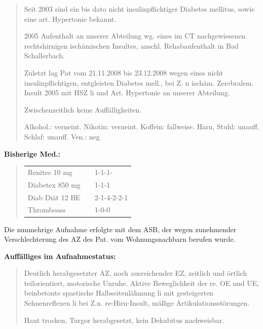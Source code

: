 {\begin{quote}
  Seit 2003 sind ein bis dato nicht insulinpflichtiger Diabetes mellitus, sowie
  eine art. Hypertonie bekannt.
  
  2005 Aufenthalt an unserer Abteilung wg. eines im CT nachgewiesenen rechtshirnigen ischämischen Insultes,
  anschl. Rehabaufenthalt in Bad Schallerbach.
  
  Zuletzt lag Pat vom 21.11.2008 bis 23.12.2008 wegen eines nicht
  insulinpflichtigen, entgleisten Diabetes mell., bei Z. n ischäm. Zerebralem.
  Insult 2005 mit HSZ li und Art.
  Hypertonie an unserer Abteilung.
  
  Zwischenzeitlich keine Auffälligkeiten.
  
  Alkohol.: verneint. Nikotin: verneint. Koffein: fallweise. Harn, Stuhl: unauff.
  Schlaf: unauff. Ven.: neg
\end{quote}


{\bfseries Bisherige Med.:} 

\begin{quote}
  \begin{tabular}{lll}
Renitec 10 mg &&1-1-1-
\\
Diabetex 850 mg &&1-1-1
\\
Diab Diät 12 BE &&2-1-4-2-2-1
\\
Thromboass &&1-0-0
\\
\end{tabular}
\end{quote}





 Die nunmehrige Aufnahme erfolgte mit dem ASB, der wegen zunehmender
 Verschlechterung des AZ des Pat. vom Wohnungsnachbarn berufen wurde.

{\bfseries Auffälliges im Aufnahmestatus:}

\begin{quote}
 Deutlich herabgesetzter AZ, noch ausreichender EZ, zeitlich und örtlich
 teilorientiert, motorische Unruhe. Aktive Beweglichkeit der re.
 OE und UE, beinbetonte
 spastische Halbseitenlähmung li mit gesteigerten Sehnenreflexen li bei Z.n. re-Hirn-Insult, mäßige Artikulationsstörungen.
 
 Haut trocken, Turgor herabgesetzt, kein
 Dekubitus nachweisbar.
 \end{quote}

}
